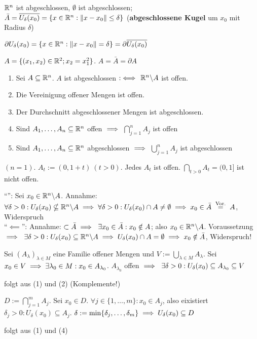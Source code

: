\documentclass[a4paper,oneside,DIV15,BCOR12mm,chapterprefix=true,headings=onelinechapter]{scrbook}
\begin{document}
\begin{beispiele}
\item $\mathbb{R}^n$ ist abgeschlossen, $\emptyset$ ist abgeschlossen; \\ 
  $\bar{A}=\overline{U_\delta(x_0)} = \{x\in\mathbb{R}^n: \|x-x_0\| \le \delta\}$ (\textbf{abgeschlossene Kugel} um $x_0$ mit Radius $\delta$)
\item $\partial U_\delta(x_0) = \{x\in\mathbb{R}^n: \|x-x_0\|=\delta\} = \partial \overline{U_\delta(x_0)}$
\item $A = \{(x_1,x_2)\in\mathbb{R}^2; x_2 = x_1^2\}$. $A=\bar{A}=\partial A$
\end{beispiele}

\begin{satz}
 \begin{enumerate}
 \item Sei $A\subseteq\mathbb{R}^n$. $A$ ist abgeschlossen $:\iff$  $\mathbb{R}^n\backslash A$ ist offen.
 \item Die Vereinigung offener Mengen ist offen.
 \item Der Durchschnitt abgeschlossener Mengen ist abgeschlossen.
 \item Sind $A_1,\ldots,A_n\subseteq\mathbb{R}^n$ offen $\implies$ $\bigcap_{j=1}^nA_j$ ist offen
 \item Sind $A_1,\ldots,A_n\subseteq\mathbb{R}^n$ abgeschlossen $\implies$ $\bigcup_{j=1}^nA_j$ ist abgeschlossen
 \end{enumerate}
\end{satz}

\begin{beispiel}
  $(n=1)$. $A_t := (0,1+t)\ (t>0)$. Jedes $A_t$ ist offen. $\bigcap_{t>0}A_t = (0,1]$ ist nicht offen.
\end{beispiel}

\begin{beweise}
 \item "`\folgt"': Sei $x_0\in\mathbb{R}^n\backslash A$. Annahme: $\forall \delta>0: U_\delta(x_0) \nsubseteq \MdR^n\backslash A\folgt\forall\delta>0: U_\delta(x_0)\cap A\ne\emptyset \folgt x_0\in\bar{A} \gleichnach{Vor.} A$, Widerspruch \\
 "`$\impliedby$"': Annahme: $\subset\bar{A} \implies \ \exists x_0\in\bar{A}: x_0\notin A$; also $x_0\in\mathbb{R}^n\backslash A$. Voraussetzung $\implies \ \exists \delta > 0: U_\delta(x_0) \subseteq \mathbb{R}^n\backslash A \implies U_\delta(x_0) \cap A = \emptyset \implies x_0 \notin \bar{A}$, Widerspruch!
 \item Sei $(A_\lambda)_{\lambda\in M}$ eine Familie offener Mengen und $V := \bigcup_{\lambda\in M} A_\lambda$. Sei $x_0\in V \implies \exists\lambda_0\in M: x_0 \in A_{\lambda_0}$. $A_{\lambda_0}$ offen $\implies \ \exists \delta > 0: U_\delta(x_0) \subseteq A_{\lambda_0} \subseteq V$
 \item folgt aus (1) und (2) (Komplemente!)
 \item $D:=\bigcap_{j=1}^mA_j$. Sei $x_0\in D$. $\forall j\in\{1,\ldots,m\}: x_0\in A_j$, also eixistiert $\delta_j>0: U_\delta(x_0)\subseteq A_j$. $\delta := \min\{\delta_j,\ldots,\delta_m\} \implies U_\delta(x_0) \subseteq D$
 \item folgt aus (1) und (4)
\end{beweise}
\end{document}
